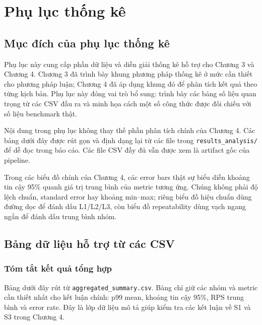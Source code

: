 
\chapter{Phụ lục thống kê}
\label{app:statistics}

\section{Mục đích của phụ lục thống kê}

Phụ lục này cung cấp phần dữ liệu và diễn giải thống kê hỗ trợ cho Chương 3 và Chương 4. Chương 3 đã trình bày khung phương pháp thống kê ở mức cần thiết cho phương pháp luận; Chương 4 đã áp dụng khung đó để phân tích kết quả theo từng kịch bản. Phụ lục này đóng vai trò bổ sung: trình bày các bảng số liệu quan trọng từ các CSV đầu ra và minh họa cách một số công thức được đối chiếu với số liệu benchmark thật.

Nội dung trong phụ lục không thay thế phần phân tích chính của Chương 4. Các bảng dưới đây được rút gọn và định dạng lại từ các file trong \texttt{results\_analysis/} để dễ đọc trong báo cáo. Các file CSV đầy đủ vẫn được xem là artifact gốc của pipeline.

Trong các biểu đồ chính của Chương 4, các error bars thật sự biểu diễn khoảng tin cậy 95\% quanh giá trị trung bình của metric tương ứng. Chúng không phải độ lệch chuẩn, standard error hay khoảng min--max; riêng biểu đồ hiệu chuẩn dùng đường dọc để đánh dấu L1/L2/L3, còn biểu đồ repeatability dùng vạch ngang ngắn để đánh dấu trung bình nhóm.

\section{Bảng dữ liệu hỗ trợ từ các CSV}

\subsection{Tóm tắt kết quả tổng hợp}

Bảng dưới đây rút từ \texttt{aggregated\_summary.csv}. Bảng chỉ giữ các nhóm và metric cần thiết nhất cho kết luận chính: p99 mean, khoảng tin cậy 95\%, RPS trung bình và error rate. Đây là lớp dữ liệu mô tả giúp kiểm tra các kết luận về S1 và S3 trong Chương 4.

